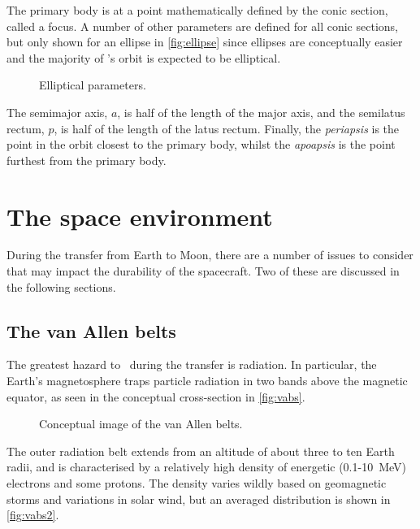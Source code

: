 The primary body is at a point mathematically defined by the conic section, called a focus. A number of other parameters are defined for all conic sections, but only shown for an ellipse in \autoref{fig:ellipse} since ellipses are conceptually easier and the majority of \BW's orbit is expected to be elliptical.

\begin{figure} 
\centering
\def\svgwidth{0.9\textwidth}

\caption{Elliptical parameters.} \label{fig:ellipse}
\end{figure}

The semimajor axis, $a$, is half of the length of the major axis, and the semilatus rectum, $p$, is half of the length of the latus rectum. Finally, the \emph{periapsis} is the point in the orbit closest to the primary body, whilst the \emph{apoapsis} is the point furthest from the primary body.


\section{The space environment} \label{sec:Environment}

During the transfer from Earth to Moon, there are a number of issues to consider that may impact the durability of the spacecraft. Two of these are discussed in the following sections.

\subsection{The van Allen belts} \label{sub:VABs}

The greatest hazard to \BW\ during the transfer is radiation. In particular, the Earth's magnetosphere traps particle radiation in two bands above the magnetic equator, as seen in the conceptual cross-section in \autoref{fig:vabs}. 

\begin{figure}
\centering
\def\svgwidth{\figurewidth}

\caption{Conceptual image of the van Allen belts.} \label{fig:vabs}
\end{figure}

The outer radiation belt extends from an altitude of about three to ten Earth radii, and is characterised by a relatively high density of energetic (0.1-10~MeV) electrons and some protons. The density varies wildly based on geomagnetic storms and variations in solar wind, but an averaged distribution is shown in \autoref{fig:vabs2}.

